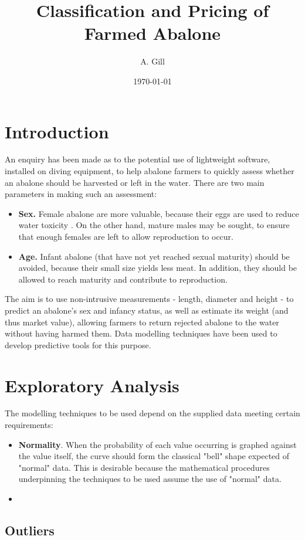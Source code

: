 \documentclass[11pt, a4paper]{article}
\title{\large\bfseries Classification and Pricing of Farmed Abalone}
\author{\normalsize A. Gill}
\date{\small \today}
\begin{document}
    
    \maketitle

    \section*{Introduction}    
      
    An enquiry has been made as to the potential use of lightweight software, installed on diving equipment, to help abalone farmers to quickly assess whether an abalone should be harvested or left in the water. There are two main parameters in making such an assessment:

    \begin{itemize}
        \item\textbf{Sex.} Female abalone are more valuable, because their eggs are used to reduce water toxicity \parencite{atlantic}. On the other hand, mature males may be sought, to ensure that enough females are left to allow reproduction to occur.
        \item\textbf{Age.} Infant abalone (that have not yet reached sexual maturity) should be avoided, because their small size yields less meat. In addition, they should be allowed to reach maturity and contribute to reproduction.
    \end{itemize} 

    The aim is to use non-intrusive measurements - length, diameter and height - to predict an abalone's sex and infancy status, as well as estimate its weight (and thus market value), allowing farmers to return rejected abalone to the water without having harmed them. Data modelling techniques have been used to develop predictive tools for this purpose.

    \section{Exploratory Analysis}

    The modelling techniques to be used depend on the supplied data meeting certain requirements:

    \begin{itemize}
        \item\textbf{Normality}. When the probability of each value occurring is graphed against the value itself, the curve should form the classical "bell" shape expected of "normal" data. This is desirable because the mathematical procedures underpinning the techniques to be used assume the use of "normal" data.
        \item 
    \end{itemize}



    \subsection{Outliers}
\end{document}
